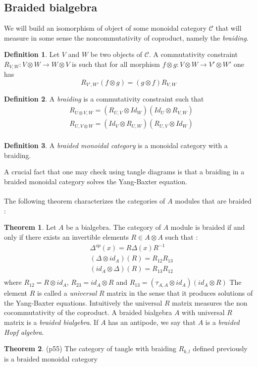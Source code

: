 \documentclass{article}
\theoremstyle{definition}
\newtheorem{theo}{Theorem}[section]
\newtheorem{Def}{Definition}[section]
\begin{document}
\subsection{Braided bialgebra} We will build an isomorphism of object of some monoidal category $\mathcal{C}$ that will measure in some sense the noncommutativity of coproduct, namely the \textit{braiding}.
\begin{Def} Let $V$ and $W$ be two objects of $\mathcal{C}$. A commutativity constraint $R_{V,W}:V\otimes W\to W\otimes V$ is such that for all morphism $f\otimes g : V\otimes W\to V'\otimes W'$ one has $$R_{V',W'}(f\otimes g)=(g\otimes f)R_{V,W} $$
\end{Def}
\begin{Def} A \textit{braiding} is a commutativity constraint such that \begin{align*}
&R_{U\otimes V,W}=(R_{U,V}\otimes Id_W)(Id_U\otimes R_{V,W})\\
&R_{U,V\otimes W}=(Id_V\otimes R_{U,W})(R_{U,V}\otimes Id_W)\\
\end{align*}
\end{Def}
\begin{Def}
A \textit{braided monoidal category} is a monoidal category with a braiding.
\end{Def}
A crucial fact that one may check using tangle diagrams is that a braiding in a braided monoidal category solves the
Yang-Baxter equation.\\\\
The following theorem characterizes the categories of $A$ modules that are braided :
\begin{theo} Let $A$ be a bialgebra. The category of $A$ module is braided if and only if there exists an invertible elements $R\in A\otimes A$ such that : \begin{align*} 
&\Delta^{op}(x)=R\Delta(x) R^{-1}\\
&(\Delta\otimes id_A)(R)=R_{12}R_{13}\\
&(id_A\otimes\Delta)(R)=R_{13}R_{12}\\
\end{align*}
where $R_{12}=R\otimes id_A$, $R_{23}=id_A\otimes R$ and $R_{13}=(\tau_{A,A}\otimes id_A)(id_A\otimes R)$
The element $R$ is called a \textit{universal} $R$ matrix in the sense that it produces solutions of the Yang-Baxter equations. Intuitively the universal $R$ matrix measures the non cocommutativity of the coproduct.\vspace{0.5cm}
A braided bialgebra $A$ with universal $R$ matrix is a \textit{braided bialgebra}. If $A$ has an antipode, we say that $A$ is a \textit{braided  Hopf algebra}.
\end{theo}
\begin{theo}\cite{KasRossTur}(p55) The category of tangle with braiding $R_{k,l}$ defined previously is a braided monoidal category
\end{theo}
\end{document}
